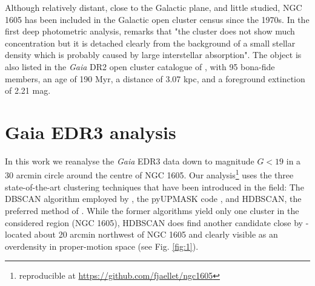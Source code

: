 \documentclass[RNAAS]{aastex631}
\begin{document}
Although relatively distant, close to the Galactic plane, and little studied, NGC 1605 has been included in the Galactic open cluster census since the 1970s. In the first deep photometric analysis, \citet{Fang1970} remarks that "the cluster does not show much concentration but it is detached clearly from the background of a small stellar density which is probably caused by large interstellar absorption". %
The object is also listed in the {\it Gaia} DR2 open cluster catalogue of \citet{Cantat2020}, with 95 bona-fide members, an age of 190 Myr, a distance of 3.07 kpc, and a foreground extinction of 2.21 mag.

\section{Gaia EDR3 analysis}
In this work we reanalyse the {\it Gaia} EDR3 data \citep{Gaia2021} down to magnitude $G<19$ in a 30 arcmin circle around the centre of NGC 1605. Our analysis\footnote{reproducible at \url{https://github.com/fjaellet/ngc1605}} uses the three state-of-the-art clustering techniques that have been introduced in the field: The DBSCAN algorithm employed by \citet{Castro2022}, the pyUPMASK code \citep{Pera2021}, and HDBSCAN, the preferred method of \citet{Hunt2021}. 
While the former algorithms yield only one cluster in the considered region (NGC 1605), HDBSCAN does find another candidate close by - located about 20 arcmin northwest of NGC 1605 and clearly visible as an overdensity in proper-motion space (see Fig. \ref{fig:1}).
\end{document}
